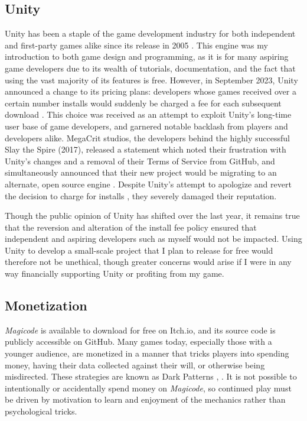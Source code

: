 \documentclass[10pt,twocolumn]{article}
\begin{document}
\subsection{Unity}
Unity has been a staple of the game development industry for both independent and first-party games alike since its release in 2005 \cite{unity-website}. This engine was my introduction to both game design and programming, as it is for many aspiring game developers due to its wealth of tutorials, documentation, and the fact that using the vast majority of its features is free. However, in September 2023, Unity announced a change to its pricing plans: developers whose games received over a certain number installs would suddenly be charged a fee for each subsequent download \cite{unity-deleted-post}. This choice was received as an attempt to exploit Unity’s long-time user base of game developers, and garnered notable backlash from players and developers alike. MegaCrit studios, the developers behind the highly successful Slay the Spire (2017), released a statement which noted their frustration with Unity’s changes and a removal of their Terms of Service from GitHub, and simultaneously announced that their new project would be migrating to an alternate, open source engine \cite{sts-tweet}. Despite Unity’s attempt to apologize and revert the decision to charge for installs \cite{unity-runtime-pricing}, they severely damaged their reputation.

Though the public opinion of Unity has shifted over the last year, it remains true that the reversion and alteration of the install fee policy ensured that independent and aspiring developers such as myself would not be impacted. Using Unity to develop a small-scale project that I plan to release for free would therefore not be unethical, though greater concerns would arise if I were in any way financially supporting Unity or profiting from my game.

\subsection{Monetization}
\textit{Magicode} is available to download for free on Itch.io, and its source code is publicly accessible on GitHub. Many games today, especially those with a younger audience, are monetized in a manner that tricks players into spending money, having their data collected against their will, or otherwise being misdirected. These strategies are known as Dark Patterns \cite{dark-patterns-website}, \cite{dark-patterns-from-class}. It is not possible to intentionally or accidentally spend money on \textit{Magicode}, so continued play must be driven by motivation to learn and enjoyment of the mechanics rather than psychological tricks.
\end{document}
